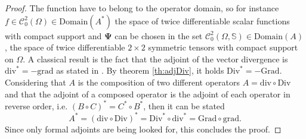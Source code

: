 \begin{theorem}
\begin{proof}
		
		The function have to belong to the operator domain, so for instance $f \in \mathcal{C}_0^2(\Omega) \in \mathrm{Domain}(A^*)$ the space of twice differentiable scalar functions with compact support and $\bm{\Psi}$ can be chosen in the set $\mathcal{C}_{0}^2(\Omega, \mathbb{S}) \in \mathrm{Domain}(A)$, the space of twice differentiable $2 \times 2$ symmetric tensors with compact support on $\Omega$. A classical result is the fact that the adjoint of the vector divergence is $\mathrm{div}^* = -\mathrm{grad}$ as stated in \cite{zwart2015wave}. By theorem \ref{th:adjDiv}, it holds $\mathrm{Div}^* = -\mathrm{Grad}$. Considering that $A$ is the composition of two different operators $A = \mathrm{div} \circ \mathrm{Div}$ and that the adjoint of a composed operator is the adjoint of each operator in reverse order, i.e. $(B \circ C)^* = C^* \circ B^*$, then it can be stated
		\begin{equation*}
		A^* = (\mathrm{div} \circ \mathrm{Div})^* = \mathrm{Div}^* \circ \mathrm{div}^* = \mathrm{Grad} \circ \mathrm{grad}.
		\end{equation*}  
		Since only formal adjoints are being looked for, this concludes the proof.
	\end{proof}
\end{theorem}


